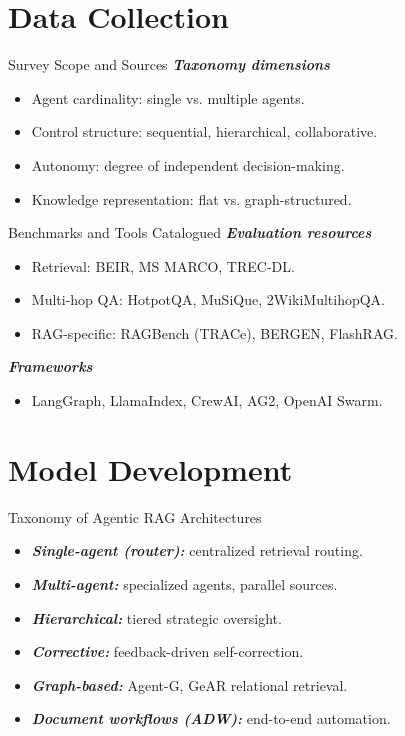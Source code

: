 \documentclass{beamer}
\begin{document}
\section{Data Collection}
\begin{frame}{Survey Scope and Sources}
\textbf{\textit{Taxonomy dimensions}}
\begin{itemize}
\item Agent cardinality: single vs. multiple agents.
\item Control structure: sequential, hierarchical, collaborative.
\item Autonomy: degree of independent decision-making.
\item Knowledge representation: flat vs. graph-structured.
\end{itemize}
\end{frame}

\begin{frame}{Benchmarks and Tools Catalogued}
\textbf{\textit{Evaluation resources}}
\begin{itemize}
\item Retrieval: BEIR, MS MARCO, TREC-DL.
\item Multi-hop QA: HotpotQA, MuSiQue, 2WikiMultihopQA.
\item RAG-specific: RAGBench (TRACe), BERGEN, FlashRAG.
\end{itemize}
\textbf{\textit{Frameworks}}
\begin{itemize}
\item LangGraph, LlamaIndex, CrewAI, AG2, OpenAI Swarm.
\end{itemize}
\end{frame}

\section{Model Development}
\begin{frame}{Taxonomy of Agentic RAG Architectures}
\begin{itemize}
\item \textbf{\textit{Single-agent (router):}} centralized retrieval routing.
\item \textbf{\textit{Multi-agent:}} specialized agents, parallel sources.
\item \textbf{\textit{Hierarchical:}} tiered strategic oversight.
\item \textbf{\textit{Corrective:}} feedback-driven self-correction.
\item \textbf{\textit{Graph-based:}} Agent-G, GeAR relational retrieval.
\item \textbf{\textit{Document workflows (ADW):}} end-to-end automation.
\end{itemize}
\end{frame}
\end{document}
